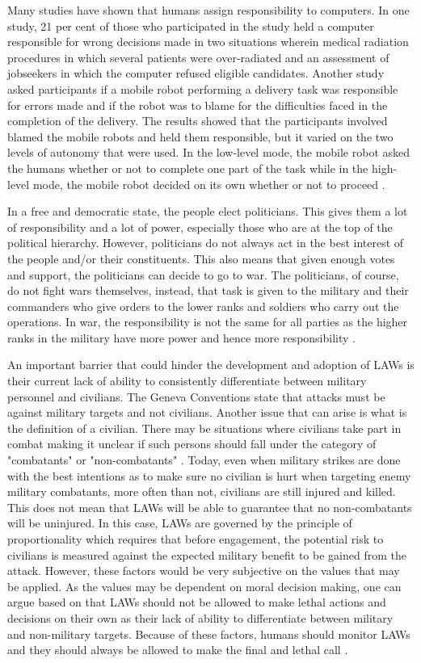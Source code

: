 \documentclass[journal]{IEEEtran}
\begin{document}
Many studies have shown that humans assign responsibility to computers. In one study, 21 per cent of those who participated in the study held a computer responsible for wrong decisions made in two situations wherein medical radiation procedures in which several patients were over-radiated and an assessment of jobseekers in which the computer refused eligible candidates. Another study asked participants if a mobile robot performing a delivery task was responsible for errors made and if the robot was to blame for the difficulties faced in the completion of the delivery. The results showed that the participants involved blamed the mobile robots and held them responsible, but it varied on the two levels of autonomy that were used. In the low-level mode, the mobile robot asked the humans whether or not to complete one part of the task while in the high-level mode, the mobile robot decided on its own whether or not to proceed \cite{Hellstrom2013-HELOTM-2}.

In a free and democratic state, the people elect politicians. This gives them a lot of responsibility and a lot of power, especially those who are at the top of the political hierarchy. However, politicians do not always act in the best interest of the people and/or their constituents. This also means that given enough votes and support, the politicians can decide to go to war. The politicians, of course, do not fight wars themselves, instead, that task is given to the military and their commanders who give orders to the lower ranks and soldiers who carry out the operations. In war, the responsibility is not the same for all parties as the higher ranks in the military have more power and hence more responsibility \cite{Hellstrom2013-HELOTM-2}.

An important barrier that could hinder the development and adoption of LAWs is their current lack of ability to consistently differentiate between military personnel and civilians. The Geneva Conventions state that attacks must be against military targets and not civilians. Another issue that can arise is what is the definition of a civilian. There may be situations where civilians take part in combat making it unclear if such persons should fall under the category of "combatants" or "non-combatants" \cite{umbrello2020future}. Today, even when military strikes are done with the best intentions as to make sure no civilian is hurt when targeting enemy military combatants, more often than not, civilians are still injured and killed. This does not mean that LAWs will be able to guarantee that no non-combatants will be uninjured. In this case, LAWs are governed by the principle of proportionality which requires that before engagement, the potential risk to civilians is measured against the expected military benefit to be gained from the attack. However, these factors would be very subjective on the values that may be applied. As the values may be dependent on moral decision making, one can argue based on that LAWs should not be allowed to make lethal actions and decisions on their own as their lack of ability to differentiate between military and non-military targets. Because of these factors, humans should monitor LAWs and they should always be allowed to make the final and lethal call \cite{umbrello2020future}.
\end{document}
